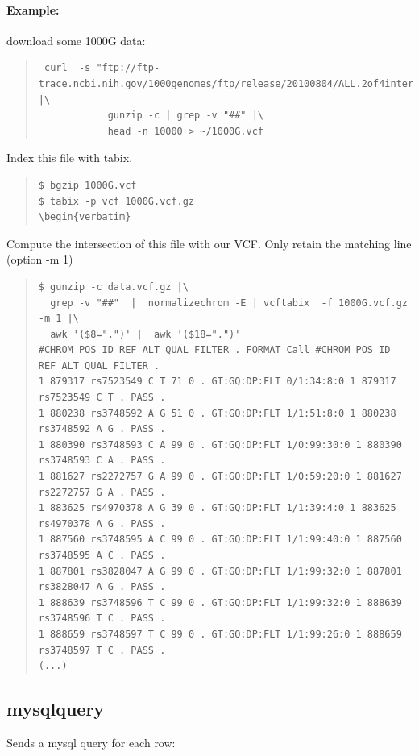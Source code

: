 \documentclass[12pt]{article}
\begin{document}
\paragraph{Example:}
 download some 1000G data:
\begin{quote}
\begin{verbatim}
 curl  -s "ftp://ftp-trace.ncbi.nih.gov/1000genomes/ftp/release/20100804/ALL.2of4intersection.20100804.sites.vcf.gz" |\
            gunzip -c | grep -v "##" |\
            head -n 10000 > ~/1000G.vcf
\end{verbatim}
\end{quote}
Index this file with tabix.
\begin{quote}
\begin{verbatim}
$ bgzip 1000G.vcf
$ tabix -p vcf 1000G.vcf.gz
\begin{verbatim}
\end{verbatim}
\end{quote}
Compute the intersection of this file with our VCF. Only retain the matching line (option -m 1)
\begin{quote}
\begin{verbatim}
$ gunzip -c data.vcf.gz |\
  grep -v "##"  |  normalizechrom -E | vcftabix  -f 1000G.vcf.gz -m 1 |\
  awk '($8=".")' |  awk '($18=".")'
#CHROM POS ID REF ALT QUAL FILTER . FORMAT Call #CHROM POS ID REF ALT QUAL FILTER .
1 879317 rs7523549 C T 71 0 . GT:GQ:DP:FLT 0/1:34:8:0 1 879317 rs7523549 C T . PASS .
1 880238 rs3748592 A G 51 0 . GT:GQ:DP:FLT 1/1:51:8:0 1 880238 rs3748592 A G . PASS .
1 880390 rs3748593 C A 99 0 . GT:GQ:DP:FLT 1/0:99:30:0 1 880390 rs3748593 C A . PASS .
1 881627 rs2272757 G A 99 0 . GT:GQ:DP:FLT 1/0:59:20:0 1 881627 rs2272757 G A . PASS .
1 883625 rs4970378 A G 39 0 . GT:GQ:DP:FLT 1/1:39:4:0 1 883625 rs4970378 A G . PASS .
1 887560 rs3748595 A C 99 0 . GT:GQ:DP:FLT 1/1:99:40:0 1 887560 rs3748595 A C . PASS .
1 887801 rs3828047 A G 99 0 . GT:GQ:DP:FLT 1/1:99:32:0 1 887801 rs3828047 A G . PASS .
1 888639 rs3748596 T C 99 0 . GT:GQ:DP:FLT 1/1:99:32:0 1 888639 rs3748596 T C . PASS .
1 888659 rs3748597 T C 99 0 . GT:GQ:DP:FLT 1/1:99:26:0 1 888659 rs3748597 T C . PASS .
(...)
\end{verbatim}
\end{quote}


\subsection{mysqlquery}
Sends a mysql query for each row:
\end{document}
